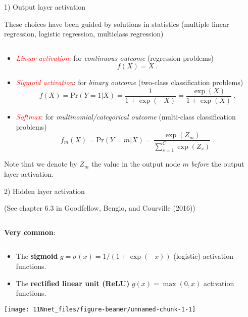 \documentclass[
  10pt,
  ignorenonframetext,
]{beamer}
\providecommand{\tightlist}{%
  \setlength{\itemsep}{0pt}\setlength{\parskip}{0pt}}
\begin{document}
\begin{frame}
\begin{block}{1) Output layer activation}
\protect\hypertarget{output-layer-activation}{}
\(~\)

These choices have been guided by solutions in statistics (multiple
linear regression, logistic regression, multiclass regression)

\(~\)

\begin{itemize}
\item
  \emph{\textcolor{red}{Linear activation}}: for \emph{continuous
  outcome} (regression problems) \[f(X)=X \ .\]
\item
  \emph{\textcolor{red}{Sigmoid activation}}: for \emph{binary outcome}
  (two-class classification problems)
  \[f(X)=\text{Pr}(Y=1 | X ) = \frac{1}{1+\exp(-X)} = \frac{\exp(X)}{1+\exp(X)} \ .\]
\item
  \emph{\textcolor{red}{Softmax}}: for \emph{multinomial/categorical
  outcome} (multi-class classification problems) \[
  f_m(X) =  \text{Pr}(Y=m | X ) = \frac{\exp(Z_m)}{\sum_{s=1}^{C}\exp(Z_s)} \ .
  \]
\end{itemize}

\scriptsize

Note that we denote by \(Z_m\) the value in the output node \(m\)
\emph{before} the output layer activation.
\end{block}
\end{frame}

\begin{frame}
\begin{block}{2) Hidden layer activation}
\protect\hypertarget{hidden-layer-activation}{}
\tiny

(See chapter 6.3 in Goodfellow, Bengio, and Courville (2016))

\normalsize

\(~\)

\textbf{Very common}:

\(~\)

\begin{itemize}
\tightlist
\item
  The \textbf{sigmoid} \(g=\sigma(x)=1/(1+\exp(-x))\) (logistic)
  activation functions.
\item
  The \textbf{rectified linear unit (ReLU)} \(g(x)=\max(0,x)\)
  activation functions.
\end{itemize}

\vspace{2mm}

\centering

\texttt{[image: 11Nnet\_files/figure-beamer/unnamed-chunk-1-1]}
\end{block}
\end{frame}
\end{document}
